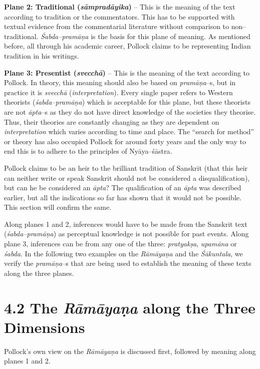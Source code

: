 \textbf{Plane 2: Traditional (\textit{sāmpradāyika})} – This is the meaning of the text according to tradition or the commentators. This has to be supported with textual evidence from the commentarial literature without comparison to non–traditional. \textit{Śabda–pramāṇa} is the basis for this plane of meaning. As mentioned before, all through his academic career, Pollock claims to be representing Indian tradition in his writings.

\textbf{Plane 3: Presentist (\textit{svecchā})} – This is the meaning of the text according to Pollock. In theory, this meaning should also be based on \textit{pramāṇa}–s, but in practice it is \textit{svecchā} (\textit{interpretation}). Every single paper refers to Western theorists (\textit{śabda–pramāṇa}) which is acceptable for this plane, but these theorists are not \textit{āpta}–s as they do not have direct knowledge of the societies they theorise. Thus, their theories are constantly changing as they are dependent on \textit{interpretation} which varies according to time and place. The “search for method” or theory has also occupied Pollock for around forty years and the only way to end this is to adhere to the principles of Nyāya–śāstra.

Pollock claims to be an heir to the brilliant tradition of Sanskrit (that this heir can neither write or speak Sanskrit should not be considered a disqualification), but can he be considered an \textit{āpta}? The qualification of an \textit{āpta} was described earlier, but all the indications so far has shown that it would not be possible. This section will confirm the same.

Along planes 1 and 2, inferences would have to be made from the Sanskrit text (\textit{śabda–pramāṇa}) as perceptual knowledge is not possible for past events. Along plane 3, inferences can be from any one of the three: \textit{pratyakṣa}, \textit{upamāna }or \textit{śabda}. In the following two examples on the \textit{Rāmāyaṇa }and the \textit{Śākuntala}, we verify the \textit{pramāṇa}–s that are being used to establish the meaning of these texts along the three planes.

\vspace{-.2cm}

\section*{4.2 The {\it {\bfseries Rāmāyaṇa}} along the Three Dimensions}

Pollock’s own view on the \textit{Rāmāyaṇa} is discussed first, followed by meaning along planes 1 and 2.

